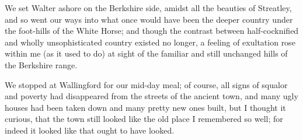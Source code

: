 We set Walter ashore on the Berkshire side, amidst all the beauties of
Streatley, and so went our ways into what once would have been the
deeper country under the foot-hills of the White Horse; and though the
contrast between half-cocknified and wholly unsophisticated country
existed no longer, a feeling of exultation rose within me (as it used to
do) at sight of the familiar and still unchanged hills of the Berkshire
range.

We stopped at Wallingford for our mid-day meal; of course, all signs of
squalor and poverty had disappeared from the streets of the ancient
town, and many ugly houses had been taken down and many pretty new ones
built, but I thought it curious, that the town still looked like the old
place I remembered so well; for indeed it looked like that ought to have
looked.

